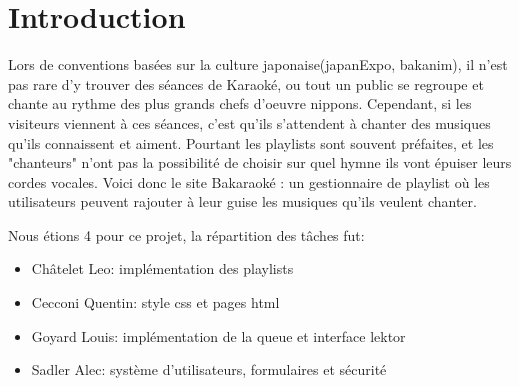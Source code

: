 \section{Introduction}
    Lors de conventions basées sur la culture japonaise(japanExpo, bakanim), il n'est pas rare d'y trouver des séances de Karaoké, ou tout un public se regroupe et chante au rythme des plus grands chefs d'oeuvre nippons. \newline
Cependant, si les visiteurs viennent à ces séances, c'est qu'ils s'attendent à chanter des musiques qu'ils connaissent et aiment. Pourtant les playlists sont souvent préfaites, et les "chanteurs" n'ont pas la possibilité de choisir sur quel hymne ils vont épuiser leurs cordes vocales. \newline
Voici donc le site Bakaraoké : un gestionnaire de playlist où les utilisateurs peuvent rajouter à leur guise les musiques qu'ils veulent chanter. \newline

Nous étions 4 pour ce projet, la répartition des tâches fut:
\begin{itemize}
    \item Châtelet Leo: implémentation des playlists
    \item Cecconi Quentin: style css et pages html
    \item Goyard Louis: implémentation de la queue et interface lektor
    \item Sadler Alec: système d'utilisateurs, formulaires et sécurité
\end{itemize}

